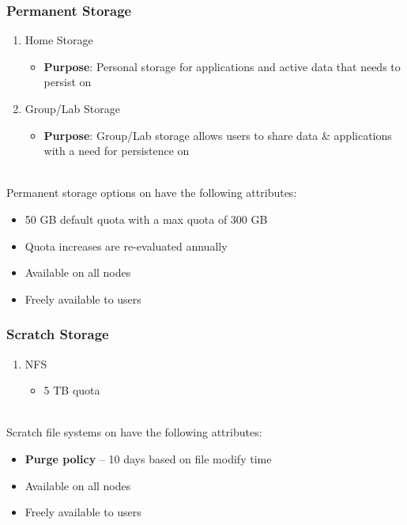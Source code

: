 \begin{frame}
  \frametitle{Permanent Storage}
  \begin{enumerate}
  \item Home Storage
    \begin{itemize}
    \item {\textbf{Purpose}}: Personal storage for applications and active data that needs to persist on {\mana}
    \end{itemize}
  \item Group/Lab Storage
    \begin{itemize}
    \item {\textbf{Purpose}}: Group/Lab storage allows users to share data \& applications with a need for persistence on {\mana}
    \end{itemize}
  \end{enumerate}
~\\
  Permanent storage options on {\mana} have the following attributes:
  \begin{itemize}
  \item 50 GB default quota with a max quota of 300 GB
  \item Quota increases are re-evaluated annually
  \item Available on all nodes
  \item Freely available to users
  \end{itemize}

\end{frame}


\begin{frame}
  \frametitle{Scratch Storage}
  \begin{enumerate}
    \item NFS
      \begin{itemize}
      \item 5 TB quota
      \end{itemize}
  \end{enumerate}
~\\
  Scratch file systems on {\mana} have the following attributes:
  \begin{itemize}
  \item \textbf{Purge policy} -- 10 days based on file modify time
  \item Available on all nodes
  \item Freely available to users
  \end{itemize}

\end{frame}



